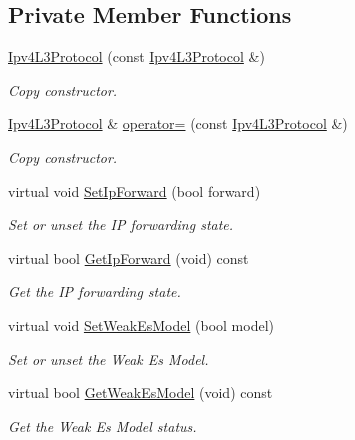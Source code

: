 \subsection*{Private Member Functions}
\begin{DoxyCompactItemize}
\item 
\hyperlink{classns3_1_1Ipv4L3Protocol_a81b92d7401aee401daea5360d478fb60}{Ipv4\+L3\+Protocol} (const \hyperlink{classns3_1_1Ipv4L3Protocol}{Ipv4\+L3\+Protocol} \&)
\begin{DoxyCompactList}\small\item\em Copy constructor. \end{DoxyCompactList}\item 
\hyperlink{classns3_1_1Ipv4L3Protocol}{Ipv4\+L3\+Protocol} \& \hyperlink{classns3_1_1Ipv4L3Protocol_a24c97a3fdb0aa3363e4968c6fb48186f}{operator=} (const \hyperlink{classns3_1_1Ipv4L3Protocol}{Ipv4\+L3\+Protocol} \&)
\begin{DoxyCompactList}\small\item\em Copy constructor. \end{DoxyCompactList}\item 
virtual void \hyperlink{classns3_1_1Ipv4L3Protocol_a455a909e3bdcb5651e0ffd3eadf850d8}{Set\+Ip\+Forward} (bool forward)
\begin{DoxyCompactList}\small\item\em Set or unset the IP forwarding state. \end{DoxyCompactList}\item 
virtual bool \hyperlink{classns3_1_1Ipv4L3Protocol_acbc9196c4f23691e6dde9890f24c5285}{Get\+Ip\+Forward} (void) const 
\begin{DoxyCompactList}\small\item\em Get the IP forwarding state. \end{DoxyCompactList}\item 
virtual void \hyperlink{classns3_1_1Ipv4L3Protocol_a45e538d92668de5fa759de6141751702}{Set\+Weak\+Es\+Model} (bool model)
\begin{DoxyCompactList}\small\item\em Set or unset the Weak Es Model. \end{DoxyCompactList}\item 
virtual bool \hyperlink{classns3_1_1Ipv4L3Protocol_ad6249ba16ffc906ac0041ce89bdc2cac}{Get\+Weak\+Es\+Model} (void) const 
\begin{DoxyCompactList}\small\item\em Get the Weak Es Model status. \end{DoxyCompactList}\item 

\end{DoxyCompactItemize}
